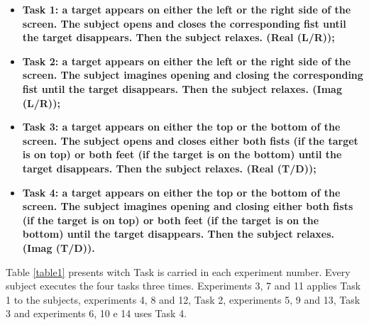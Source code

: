 \documentclass[10pt,letterpaper]{article}
\begin{document}
\begin{itemize}
  \item \bf{Task 1}: a target appears on either the left or the right side of the screen. The subject opens and closes the corresponding fist until the target disappears. Then the subject relaxes. (Real (L/R));
  \item \bf{Task 2}: a target appears on either the left or the right side of the screen. The subject \bf{imagines} opening and closing the corresponding fist until the target disappears. Then the subject relaxes. (Imag (L/R));
  \item \bf{Task 3}: a target appears on either the top or the bottom of the screen. The subject opens and closes either both fists (if the target is on top) or both feet (if the target is on the bottom) until the target disappears. Then the subject relaxes. (Real (T/D));
  \item \bf{Task 4}: a target appears on either the top or the bottom of the screen. The subject \bf{imagines} opening and closing either both fists (if the target is on top) or both feet (if the target is on the bottom) until the target disappears. Then the subject relaxes. (Imag (T/D)).
\end{itemize}

Table \ref{table1} presents witch Task is carried in each experiment number. Every subject executes the four tasks three times. Experiments 3, 7 and 11 applies Task 1 to the subjects, experiments 4, 8 and 12, Task 2, experiments 5, 9 and 13, Task 3 and experiments 6, 10 e 14 uses Task 4.
\end{document}
